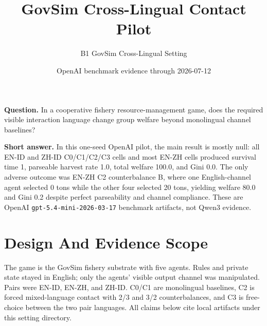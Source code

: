 \documentclass[10pt]{article}
\title{GovSim Cross-Lingual Contact Pilot}
\author{B1 GovSim Cross-Lingual Setting}
\date{OpenAI benchmark evidence through 2026-07-12}
\begin{document}
\maketitle

\textbf{Question.} In a cooperative fishery resource-management game, does the required visible interaction language change group welfare beyond monolingual channel baselines?

\textbf{Short answer.} In this one-seed OpenAI pilot, the main result is mostly null: all EN-ID and ZH-ID C0/C1/C2/C3 cells and most EN-ZH cells produced survival time 1, parseable harvest rate 1.0, total welfare 100.0, and Gini 0.0. The only adverse outcome was EN-ZH C2 counterbalance B, where one English-channel agent selected 0 tons while the other four selected 20 tons, yielding welfare 80.0 and Gini 0.2 despite perfect parseability and channel compliance. These are OpenAI \texttt{gpt-5.4-mini-2026-03-17} benchmark artifacts, not Qwen3 evidence.

\section*{Design And Evidence Scope}
The game is the GovSim fishery substrate with five agents. Rules and private state stayed in English; only the agents' visible output channel was manipulated. Pairs were EN-ID, EN-ZH, and ZH-ID. C0/C1 are monolingual baselines, C2 is forced mixed-language contact with 2/3 and 3/2 counterbalances, and C3 is free-choice between the two pair languages. All claims below cite local artifacts under this setting directory.
\end{document}
